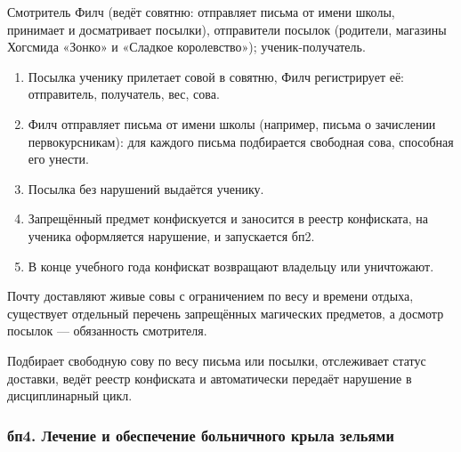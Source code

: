 \documentclass[a4paper,12pt]{article}
\begin{document}
\begin{description}[leftmargin=0pt,labelindent=0pt,style=nextline]
\item[Участники] Смотритель Филч (ведёт совятню: отправляет письма от имени школы,
  принимает и досматривает посылки), отправители посылок (родители, магазины Хогсмида
  «Зонко» и «Сладкое королевство»); ученик-получатель.
\item[Ход процесса]\leavevmode
  \begin{enumerate}
    \item Посылка ученику прилетает совой в совятню, Филч регистрирует её: отправитель, получатель, вес, сова.
        \item Филч отправляет письма от имени школы (например, письма о зачислении первокурсникам): для каждого письма подбирается свободная сова, способная его унести.
    \item Посылка без нарушений выдаётся ученику.
    \item Запрещённый предмет конфискуется и заносится в реестр конфиската, на ученика оформляется нарушение, и запускается бп2.
    \item В конце учебного года конфискат возвращают владельцу или уничтожают.
  \end{enumerate}
\item[Особенность] Почту доставляют живые совы с ограничением по весу
  и времени отдыха, существует отдельный перечень запрещённых магических предметов,
  а досмотр посылок — обязанность смотрителя.
\item[Роль ИС] Подбирает свободную сову по весу письма или посылки, отслеживает статус
  доставки, ведёт реестр конфиската и автоматически передаёт нарушение
  в дисциплинарный цикл.
\end{description}
 
\subsubsection*{бп4. Лечение и обеспечение больничного крыла зельями}
 
\end{document}
